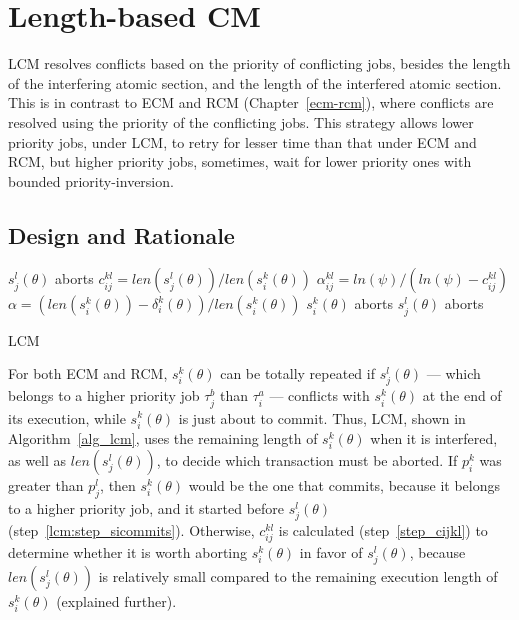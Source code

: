 \documentclass[12pt,english]{report}
\begin{document}
\section{\label{sec:lcm}Length-based CM}

LCM resolves conflicts based on the priority of conflicting jobs, besides the length of the interfering atomic section, and the length of the interfered atomic section. This is in contrast to ECM and RCM (Chapter~\ref{ecm-rcm}), where conflicts are resolved using the priority of the conflicting jobs. This strategy allows lower priority jobs, under LCM, to retry for lesser time than that under ECM and RCM, but higher priority jobs, sometimes, wait for lower priority ones with bounded priority-inversion.

\subsection{\label{sec 9.1}Design and Rationale}

\begin{algorithm}
\footnotesize{
\LinesNumbered
{}
	{$s_j^l(\theta)$ aborts\label{lcm:step_sicommits}\;}
	{$c_{ij}^{kl}=len(s_j^l(\theta))/len(s_i^k(\theta))$\label{step_cijkl}\;
	$\alpha_{ij}^{kl}=ln(\psi)/(ln(\psi)-c_{ij}^{kl})$\label{step_alphaijkl}\;
	$\alpha=\left(len(s_i^k(\theta))-\delta_i^k(\theta)\right)/len(s_i^k(\theta))$\label{step_alpha}\;
	{$s_i^k(\theta)$ aborts\label{lcm:step_siaborts}\;}
	{$s_j^l(\theta)$ aborts\label{step_sjaborts}\;}
	}
	}
\caption{LCM}
\label{alg_lcm}
\end{algorithm}


For both ECM and RCM, $s_{i}^{k}(\theta)$ can be totally repeated if $s_{j}^{l}(\theta)$ --- which belongs to a higher priority job $\tau_{j}^b$ than $\tau_{i}^a$ --- conflicts with $s_{i}^{k}(\theta)$
at the end of its execution, while $s_{i}^{k}(\theta)$ is just about
to commit. Thus, LCM, shown in Algorithm~\ref{alg_lcm}, uses the remaining length of $s_{i}^{k}(\theta)$ when it is interfered,
as well as $len(s_{j}^{l}(\theta))$, to decide which transaction must be aborted. If $p_i^k$ was greater than $p_j^l$, then $s_i^k(\theta)$ would be the one that commits, because it belongs to a higher priority job, and it started before $s_j^l(\theta)$ (step~\ref{lcm:step_sicommits}). Otherwise, $c_{ij}^{kl}$ is calculated (step~\ref{step_cijkl}) to determine whether it is worth aborting $s_i^k(\theta)$ in favor of $s_j^l(\theta)$, because $len(s_j^l(\theta))$ is relatively small compared to the remaining execution length of $s_i^k(\theta)$  (explained further).
\end{document}
